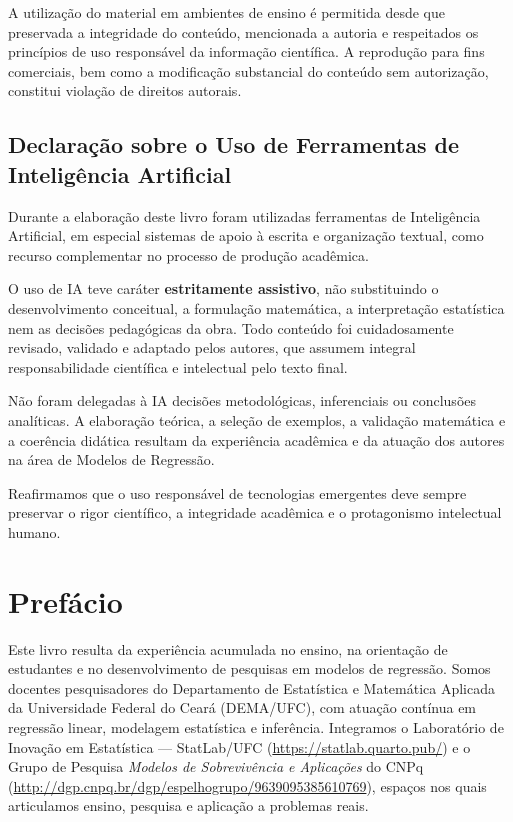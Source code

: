 \documentclass[
  letterpaper,
  DIV=11,
  numbers=noendperiod]{scrreprt}
\begin{document}
A utilização do material em ambientes de ensino é permitida desde que
preservada a integridade do conteúdo, mencionada a autoria e respeitados
os princípios de uso responsável da informação científica. A reprodução
para fins comerciais, bem como a modificação substancial do conteúdo sem
autorização, constitui violação de direitos autorais.

\section*{Declaração sobre o Uso de Ferramentas de Inteligência
Artificial}\label{declarauxe7uxe3o-sobre-o-uso-de-ferramentas-de-inteliguxeancia-artificial}


Durante a elaboração deste livro foram utilizadas ferramentas de
Inteligência Artificial, em especial sistemas de apoio à escrita e
organização textual, como recurso complementar no processo de produção
acadêmica.

O uso de IA teve caráter \textbf{estritamente assistivo}, não
substituindo o desenvolvimento conceitual, a formulação matemática, a
interpretação estatística nem as decisões pedagógicas da obra. Todo
conteúdo foi cuidadosamente revisado, validado e adaptado pelos autores,
que assumem integral responsabilidade científica e intelectual pelo
texto final.

Não foram delegadas à IA decisões metodológicas, inferenciais ou
conclusões analíticas. A elaboração teórica, a seleção de exemplos, a
validação matemática e a coerência didática resultam da experiência
acadêmica e da atuação dos autores na área de Modelos de Regressão.

Reafirmamos que o uso responsável de tecnologias emergentes deve sempre
preservar o rigor científico, a integridade acadêmica e o protagonismo
intelectual humano.


\chapter*{Prefácio}\label{prefuxe1cio}


Este livro resulta da experiência acumulada no ensino, na orientação de
estudantes e no desenvolvimento de pesquisas em modelos de regressão.
Somos docentes pesquisadores do Departamento de Estatística e Matemática
Aplicada da Universidade Federal do Ceará (DEMA/UFC), com atuação
contínua em regressão linear, modelagem estatística e inferência.
Integramos o Laboratório de Inovação em Estatística --- StatLab/UFC
(\url{https://statlab.quarto.pub/}) e o Grupo de Pesquisa \emph{Modelos
de Sobrevivência e Aplicações} do CNPq
(\url{http://dgp.cnpq.br/dgp/espelhogrupo/9639095385610769}), espaços
nos quais articulamos ensino, pesquisa e aplicação a problemas reais.
\end{document}
